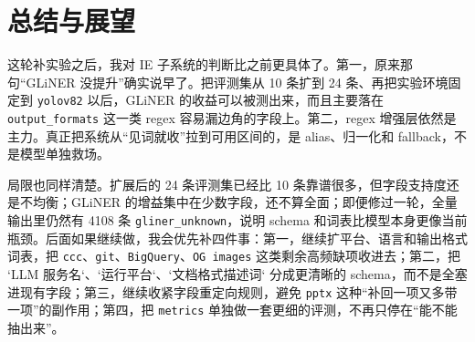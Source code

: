 \section{总结与展望}
这轮补实验之后，我对 IE 子系统的判断比之前更具体了。第一，原来那句“GLiNER 没提升”确实说早了。把评测集从 10 条扩到 24 条、再把实验环境固定到 \texttt{yolov82} 以后，GLiNER 的收益可以被测出来，而且主要落在 \texttt{output\_formats} 这一类 regex 容易漏边角的字段上。第二，regex 增强层依然是主力。真正把系统从“见词就收”拉到可用区间的，是 alias、归一化和 fallback，不是模型单独救场。

局限也同样清楚。扩展后的 24 条评测集已经比 10 条靠谱很多，但字段支持度还是不均衡；GLiNER 的增益集中在少数字段，还不算全面；即便修过一轮，全量输出里仍然有 4108 条 \texttt{gliner\_unknown}，说明 schema 和词表比模型本身更像当前瓶颈。后面如果继续做，我会优先补四件事：第一，继续扩平台、语言和输出格式词表，把 \texttt{ccc}、\texttt{git}、\texttt{BigQuery}、\texttt{OG images} 这类剩余高频缺项收进去；第二，把 `LLM 服务名`、`运行平台`、`文档格式描述词` 分成更清晰的 schema，而不是全塞进现有字段；第三，继续收紧字段重定向规则，避免 \texttt{pptx} 这种“补回一项又多带一项”的副作用；第四，把 \texttt{metrics} 单独做一套更细的评测，不再只停在“能不能抽出来”。




